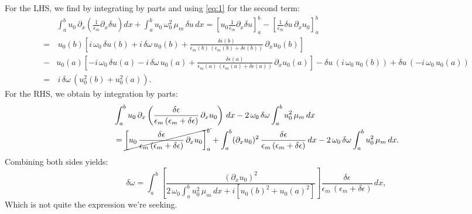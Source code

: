 For the LHS, we find by integrating by parts and using \eqref{eq:1} for the second term:
\begin{align*}
    &\int_a^b u_0 \, \partial_x \left(\frac{1}{\epsilon_m} \partial_x \delta u\right) dx + \int_a^b u_0 \, \omega_0^2 \, \mu_m \, \delta u \, dx =\left[ u_0 \frac{1}{\epsilon_m} \partial_x \delta u \right]_a^b - \left[\frac{1}{\epsilon_m} \delta u \, \partial_x u_0 \right]_a^b\\
    =& \, u_0(b) \left[i\, \omega_0 \, \delta u(b) + i \, \delta \omega \, u_0(b) + \frac{\delta \epsilon(b)}{\epsilon_m(b) \, (\epsilon_m(b) + \delta \epsilon(b))}\, \partial_x u_0(b) \right]\\
    -& u_0(a) \left[-i\, \omega_0 \, \delta u(a) - i \, \delta \omega \, u_0(a) + \frac{\delta \epsilon(a)}{\epsilon_m(a) \, (\epsilon_m(a) + \delta \epsilon(a))}\, \partial_x u_0(a) \right]- \delta u \, (i \, \omega_0 \, u_0(b)) + \delta u \, (-i \, \omega_0 \, u_0(a))\\
    =&\,  i \, \delta \omega \, (u_0^2(b) + u_0^2(a)).
\end{align*}
For the RHS, we obtain by integration by parts:
\begin{align*}
    &\int_a^b u_0 \, \partial_x \left(\frac{\delta \epsilon}{\epsilon_m \, (\epsilon_m + \delta \epsilon)} \, \partial_x u_0\right)\, dx - 2\, \omega_0 \, \delta \omega \int_a^b u_0^2 \, \mu_m \, dx\\
    &= \cancel{\left[u_0 \, \frac{\delta \epsilon}{\epsilon_m \, (\epsilon_m + \delta \epsilon)}\, \partial_x u_0 \right]_a^b} + \int_a^b (\partial_x u_0)^2 \, \frac{\delta \epsilon}{\epsilon_m \, (\epsilon_m + \delta \epsilon)} \, dx - 2\, \omega_0 \, \delta \omega \int_a^b u_0^2 \, \mu_m \, dx.
\end{align*}
Combining both sides yields:
\begin{equation*}
    \delta \omega = \int_a^b \left[\frac{(\partial_x u_0)^2}{2 \, \omega_0 \int_a^b u_0^2 \, \mu_m \, dx + i \left[u_0(b)^2 + u_0(a)^2\right]} \right] \frac{\delta \epsilon}{\epsilon_m \, (\epsilon_m + \delta \epsilon)} \, dx,
\end{equation*}
Which is not quite the expression we're seeking.